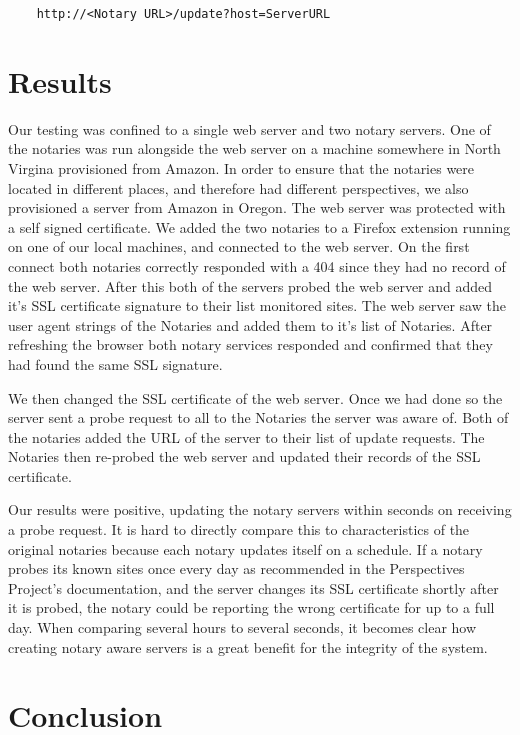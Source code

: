 \documentclass[preprint,review,12pt]{elsarticle}
\begin{document}
\begin{verbatim}
    http://<Notary URL>/update?host=ServerURL
\end{verbatim}

\section{Results}
\label{results}

Our testing was confined to a single web server and two notary servers. One of
the notaries was run alongside the web server on a machine somewhere in North
Virgina provisioned from Amazon. In order to ensure that the notaries were
located in different places, and therefore had different perspectives, we also
provisioned a server from Amazon in Oregon. The web server was protected with a
self signed certificate. We added the two notaries to a Firefox extension
running on one of our local machines, and connected to the web server. On the
first connect both notaries correctly responded with a 404 since they had no
record of the web server. After this both of the servers probed the web server
and added it's SSL certificate signature to their list monitored sites. The web
server saw the user agent strings of the Notaries and added them to it's list
of Notaries. After refreshing the browser both notary services responded and
confirmed that they had found the same SSL signature.

We then changed the SSL certificate of the web server. Once we had done so the
server sent a probe request to all to the Notaries the server was aware of.
Both of the notaries added the URL of the server to their list of update
requests. The Notaries then re-probed the web server and updated their records
of the SSL certificate.

Our results were positive, updating the notary servers within seconds on
receiving a probe request. It is hard to directly compare this to
characteristics of the original notaries because each notary updates itself on
a schedule. If a notary probes its known sites once every day as recommended in
the Perspectives Project's documentation, and the server changes its SSL
certificate shortly after it is probed, the notary could be reporting the wrong
certificate for up to a full day.  When comparing several hours to several
seconds, it becomes clear how creating notary aware servers is a great benefit
for the integrity of the system.

\section{Conclusion}
\label{conclusion}
\end{document}
